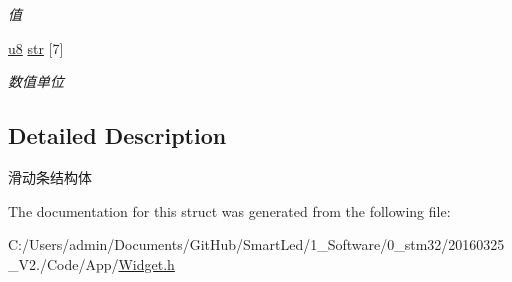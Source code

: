 \begin{DoxyCompactItemize}
\begin{DoxyCompactList}\small\item\em 值 \end{DoxyCompactList}\item 
\hypertarget{struct_s_t_r___slider_a20ac27c69f2b46f610a222d1262a533a}{\hyperlink{group___b_s_p_gaed742c436da53c1080638ce6ef7d13de}{u8} \hyperlink{struct_s_t_r___slider_a20ac27c69f2b46f610a222d1262a533a}{str} \mbox{[}7\mbox{]}}\label{struct_s_t_r___slider_a20ac27c69f2b46f610a222d1262a533a}

\begin{DoxyCompactList}\small\item\em 数值单位 \end{DoxyCompactList}\end{DoxyCompactItemize}


\subsection{\-Detailed \-Description}
滑动条结构体 

\-The documentation for this struct was generated from the following file\-:\begin{DoxyCompactItemize}
\item 
\-C\-:/\-Users/admin/\-Documents/\-Git\-Hub/\-Smart\-Led/1\-\_\-\-Software/0\-\_\-stm32/20160325\-\_\-\-V2./\-Code/\-App/\hyperlink{_widget_8h}{\-Widget.\-h}\end{DoxyCompactItemize}
